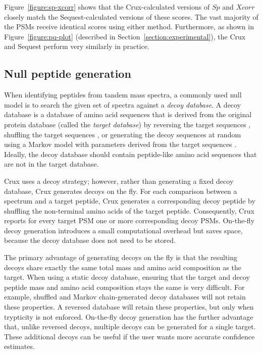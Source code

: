 \documentclass[12pt]{article}
\begin{document}
Figure~\ref{figure:sp-xcorr} shows that the Crux-calculated versions
of $Sp$ and $Xcorr$ closely match the {\sc Sequest}-calculated
versions of these scores.  The vast majority of the PSMs receive
identical scores using either method.  Furthermore, as shown in
Figure~\ref{figure:pq-plot} (described in
Section~\ref{section:experimental}), the Crux and {\sc Sequest}
perform very similarly in practice.

\subsection{Null peptide generation}
\label{section:on-the-fly}

When identifying peptides from tandem mass spectra, a commonly used
null model is to search the given set of spectra against a {\em decoy
database}.  A decoy database is a database of amino acid sequences
that is derived from the original protein database (called the {\em
target database}) by reversing the target sequences
\cite{moore:qscore}, shuffling the target sequences
\cite{klammer:effects}, or generating the decoy sequences at random
using a Markov model with parameters derived from the target sequences
\cite{colinge:olav}.  Ideally, the decoy database should contain
peptide-like amino acid sequences that are not in the target database.

Crux uses a decoy strategy; however, rather than generating a fixed
decoy database, Crux generates decoys on the fly.  For each comparison
between a spectrum and a target peptide, Crux generates a
corresponding decoy peptide by shuffling the non-terminal amino acids
of the target peptide.  Consequently, Crux reports for every target
PSM one or more corresponding decoy PSMs.  On-the-fly decoy generation
introduces a small computational overhead but saves space, because the
decoy database does not need to be stored.

The primary advantage of generating decoys on the fly is that the
resulting decoys share exactly the same total mass and amino acid
composition as the target.  When using a static decoy database,
ensuring that the target and decoy peptide mass and amino acid
composition stays the same is very difficult.  For example, shuffled
and Markov chain-generated decoy databases will not retain these
properties. A reversed database will retain these properties, but
only when trypticity is not enforced.  On-the-fly decoy generation has
the further advantage that, unlike reversed decoys, multiple decoys
can be generated for a single target.  These additional decoys can be
useful if the user wants more accurate confidence estimates.
\end{document}
